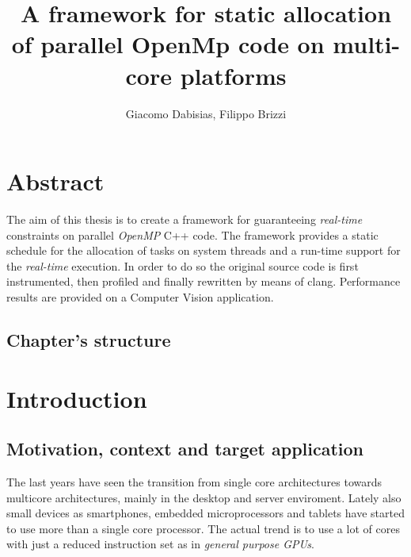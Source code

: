 \documentclass[a4paper,12pt,oneside]{book}
\author{Giacomo Dabisias, Filippo Brizzi}
\title{A framework for static allocation of parallel OpenMp code on multi-core platforms}
\begin{document}
\frontmatter
\tableofcontents

\chapter{Abstract}

The aim of this thesis is to create a framework for guaranteeing \emph{real-time} constraints on parallel \emph{OpenMP} C++ code. The framework provides a static schedule for the allocation of tasks on system threads and a run-time support for the \emph{real-time} execution. In order to do so the original source code is first instrumented, then profiled and finally rewritten by means of clang. Performance results are provided on a Computer Vision application.

\section{Chapter's structure}

\mainmatter
\chapter{Introduction}

\section{Motivation, context and target application}

The last years have seen the transition from single core architectures towards multicore architectures, mainly in the desktop and server enviroment. Lately also small devices as smartphones, embedded microprocessors and tablets have started to use more than a single core processor. The actual trend is to use a lot of cores with just a reduced instruction set as in \emph{general purpose GPUs}.
\end{document}
